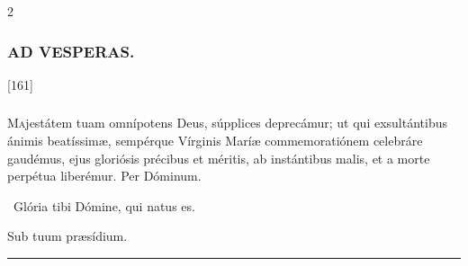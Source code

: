 \documentclass[9pt,twoside]{extarticle}
\begin{document}
\begin{multicols}{2}
{\subsubsection*{\center \textsc{AD VESPERAS.}}
\begin{tightlist}{}
\item {} [161] 
\end{tightlist}


\subsubsection*{\center {}}
\lettrine{M}ajestátem tuam omnípotens Deus, súpplices deprecámur; ut qui exsultántibus ánimis beatíssimæ, sempérque Vírginis Maríæ commemoratiónem celebráre gaudémus, ejus gloriósis précibus et méritis, ab instántibus malis, et a morte perpétua liberémur. Per Dóminum.

\begin{tightlist}{}
\item {}~Glória tibi Dómine, qui natus es.
\item {} Sub tuum præsídium.
\end{tightlist}

\begin{center}\textcolor{red}{\rule{\linewidth}{0.5pt}} \end{center}

}
\end{multicols}
\end{document}
